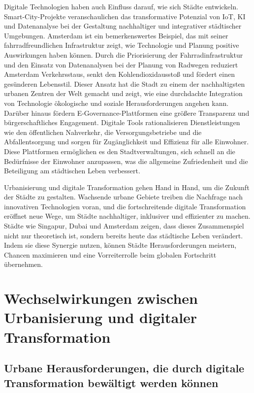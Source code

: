 \documentclass[conference,compsoc,final,a4paper, onecolumn, 11pt]{IEEEtran}
\begin{document}
Digitale Technologien haben auch Einfluss darauf, wie sich Städte entwickeln. 
Smart-City-Projekte veranschaulichen das transformative Potenzial von \ac{IoT}, \ac{KI} und Datenanalyse bei der Gestaltung nachhaltiger und integrativer städtischer Umgebungen. 
Amsterdam ist ein bemerkenswertes Beispiel, das mit seiner fahrradfreundlichen Infrastruktur zeigt, wie Technologie und Planung positive Auswirkungen haben können. 
Durch die Priorisierung der Fahrradinfrastruktur und den Einsatz von Datenanalysen bei der Planung von Radwegen reduziert Amsterdam Verkehrsstaus, senkt den Kohlendioxidausstoß und fördert einen gesünderen Lebensstil. 
Dieser Ansatz hat die Stadt zu einem der nachhaltigsten urbanen Zentren der Welt gemacht und zeigt, wie eine durchdachte Integration von Technologie ökologische und soziale Herausforderungen angehen kann. \autocite{buehler_cycling_2010}
Darüber hinaus fördern E-Governance-Plattformen eine größere Transparenz und bürgerschaftliches Engagement. 
Digitale Tools rationalisieren Dienstleistungen wie den öffentlichen Nahverkehr, die Versorgungsbetriebe und die Abfallentsorgung und sorgen für Zugänglichkeit und Effizienz für alle Einwohner. 
Diese Plattformen ermöglichen es den Stadtverwaltungen, sich schnell an die Bedürfnisse der Einwohner anzupassen, was die allgemeine Zufriedenheit und die Beteiligung am städtischen Leben verbessert.

Urbanisierung und digitale Transformation gehen Hand in Hand, um die Zukunft der Städte zu gestalten. 
Wachsende urbane Gebiete treiben die Nachfrage nach innovativen Technologien voran, und die fortschreitende digitale Transformation eröffnet neue Wege, um Städte nachhaltiger, inklusiver und effizienter zu machen. 
Städte wie Singapur, Dubai und Amsterdam zeigen, dass dieses Zusammenspiel nicht nur theoretisch ist, sondern bereits heute das städtische Leben verändert. 
Indem sie diese Synergie nutzen, können Städte Herausforderungen meistern, Chancen maximieren und eine Vorreiterrolle beim globalen Fortschritt übernehmen.


\section{Wechselwirkungen zwischen Urbanisierung und digitaler Transformation}
\subsection{Urbane Herausforderungen, die durch digitale Transformation bewältigt werden können}
\end{document}
